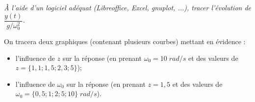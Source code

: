 \documentclass[11pt,oneside]{article}
\begin{document}
\subparagraph{}
\textit{\`A l'aide d'un logiciel adéquat (Libreoffice, Excel, gnuplot, ...), tracer l'évolution de $\dfrac{y(t)}{g / \omega_0^2}$.}


On tracera deux graphiques (contenant plusieurs courbes) mettant en évidence :
\begin{itemize}
\item l'influence de $z$ sur la réponse (en prenant $\omega_0=10\;rad/s$ et des valeurs de $z=\{1,1 ;1,5 ; 2, 3;5\}$);
\item l'influence de $\omega_0$ sur la réponse (en prenant $z=1,5$ et des valeurs de $\omega_0 = \{0,5;1;2;5;10\}\; rad/s$).
\end{itemize}

\end{document}
